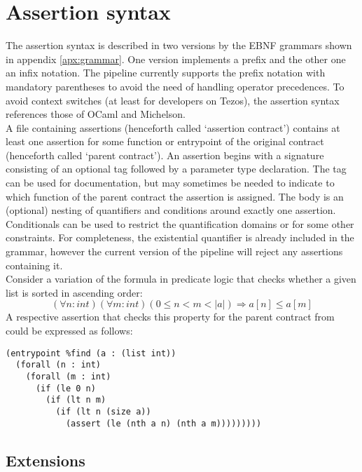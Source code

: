 \section{Assertion syntax}
The assertion syntax is described in two versions by the EBNF grammars shown in appendix \ref{apx:grammar}. One version implements a prefix and the other one an infix notation. The pipeline currently supports the prefix notation with mandatory parentheses to avoid the need of handling operator precedences. To avoid context switches (at least for developers on Tezos), the assertion syntax references those of OCaml and Michelson.\\
A file containing assertions (henceforth called `assertion contract') contains at least one assertion for some function or entrypoint of the original contract (henceforth called `parent contract'). An assertion begins with a signature consisting of an optional tag followed by a parameter type declaration. The tag can be used for documentation, but may sometimes be needed to indicate to which function of the parent contract the assertion is assigned. The body is an (optional) nesting of quantifiers and conditions around exactly one assertion. Conditionals can be used to restrict the quantification domains or for some other constraints. For completeness, the existential quantifier is already included in the grammar, however the current version of the pipeline will reject any assertions containing it.\\
Consider a variation of the formula in predicate logic that checks whether a given list is sorted in ascending order:
\begin{equation}\label{eq:sorted_v2}
	(\forall n : int)(\forall m : int) (0 \leq n < m < |a|) \Rightarrow a[n] \leq a[m]
\end{equation}
A respective assertion that checks this property for the parent contract from  could be expressed as follows:
\begin{lstlisting}[language=Assertion]
(entrypoint %find (a : (list int))
  (forall (n : int)
    (forall (m : int)
      (if (le 0 n)
        (if (lt n m)
          (if (lt n (size a))
            (assert (le (nth a n) (nth a m)))))))))
\end{lstlisting}

\subsection{Extensions}

